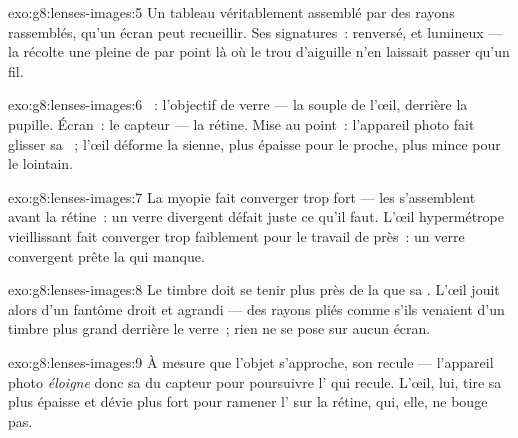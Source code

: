 \begin{solution}{exo:g8:lenses-images:5}
Un tableau véritablement assemblé par des rayons rassemblés, qu'un
écran peut recueillir. Ses signatures~: renversé, et lumineux --- la
 récolte une pleine  de  par point là où le
trou d'aiguille n'en laissait passer qu'un fil.
\end{solution}

\begin{solution}{exo:g8:lenses-images:6}
~: l'objectif de verre --- la  souple de l'œil,
derrière la pupille. Écran~: le capteur --- la rétine. Mise au
point~: l'appareil photo fait glisser sa ~; l'œil déforme la
sienne, plus épaisse pour le proche, plus mince pour le lointain.
\end{solution}

\begin{solution}{exo:g8:lenses-images:7}
La myopie fait converger trop fort --- les  s'assemblent avant
la rétine~: un verre divergent défait juste ce qu'il faut. L'œil
hypermétrope vieillissant fait converger trop faiblement pour le
travail de près~: un verre convergent prête la  qui manque.
\end{solution}

\begin{solution}{exo:g8:lenses-images:8}
Le timbre doit se tenir plus près de la  que sa . L'œil jouit alors d'un fantôme droit et agrandi --- des rayons
pliés comme s'ils venaient d'un timbre plus grand derrière le verre~;
rien ne se pose sur aucun écran.
\end{solution}

\begin{solution}{exo:g8:lenses-images:9}
À mesure que l'objet s'approche, son  recule --- l'appareil photo
\emph{éloigne} donc sa  du capteur pour poursuivre l' qui
recule. L'œil, lui, tire sa  plus épaisse et dévie plus fort
pour ramener l' sur la rétine, qui, elle, ne bouge pas.
\end{solution}

